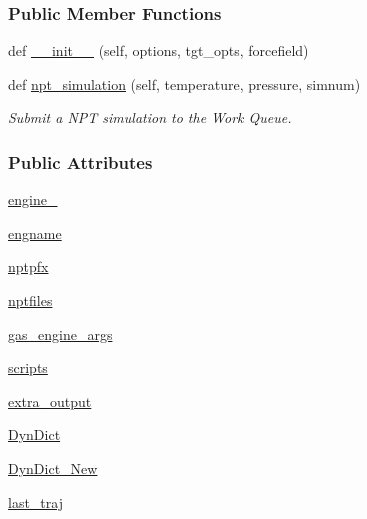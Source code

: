 \subsubsection*{Public Member Functions}
\begin{DoxyCompactItemize}
\item 
def \hyperlink{classsrc_1_1tinkerio_1_1Liquid__TINKER_a4b4efabbcc7944031fd973d51bc1d68e}{\+\_\+\+\_\+init\+\_\+\+\_\+} (self, options, tgt\+\_\+opts, forcefield)
\item 
def \hyperlink{classsrc_1_1tinkerio_1_1Liquid__TINKER_a48da5369f022089db35b92671bdc9913}{npt\+\_\+simulation} (self, temperature, pressure, simnum)
\begin{DoxyCompactList}\small\item\em Submit a N\+PT simulation to the Work Queue. \end{DoxyCompactList}\end{DoxyCompactItemize}
\subsubsection*{Public Attributes}
\begin{DoxyCompactItemize}
\item 
\hyperlink{classsrc_1_1tinkerio_1_1Liquid__TINKER_acec779d9ca796fcf324e4df741074653}{engine\+\_\+}
\item 
\hyperlink{classsrc_1_1tinkerio_1_1Liquid__TINKER_a24be54be87aacf4feb59f9744de376c1}{engname}
\item 
\hyperlink{classsrc_1_1tinkerio_1_1Liquid__TINKER_a29c1d669729cd448ea016999caf86647}{nptpfx}
\item 
\hyperlink{classsrc_1_1tinkerio_1_1Liquid__TINKER_a930840e4cb144b48c532011f09e348d2}{nptfiles}
\item 
\hyperlink{classsrc_1_1tinkerio_1_1Liquid__TINKER_ab2fc356c77dde647fe1e7e0e99d7560c}{gas\+\_\+engine\+\_\+args}
\item 
\hyperlink{classsrc_1_1tinkerio_1_1Liquid__TINKER_a8c949d56f7960dc43f7a4ab5b92546e5}{scripts}
\item 
\hyperlink{classsrc_1_1tinkerio_1_1Liquid__TINKER_a2a5cbb09eaf89ce8d8a56dae52250bc6}{extra\+\_\+output}
\item 
\hyperlink{classsrc_1_1tinkerio_1_1Liquid__TINKER_a1a13961b47d0ddf83f76e6aaf68a9324}{Dyn\+Dict}
\item 
\hyperlink{classsrc_1_1tinkerio_1_1Liquid__TINKER_a2b199a56a4b0aad09f4bdcdace547029}{Dyn\+Dict\+\_\+\+New}
\item 
\hyperlink{classsrc_1_1tinkerio_1_1Liquid__TINKER_a655e0f2c0fed0a1410aa0658d21cadb2}{last\+\_\+traj}
\end{DoxyCompactItemize}


